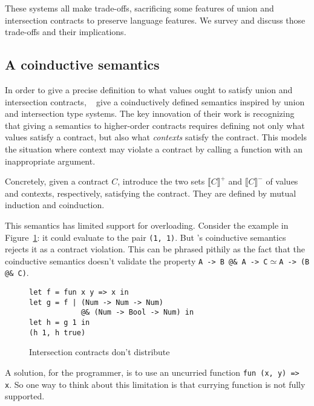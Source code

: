 \documentclass[sigplan,10pt]{acmart}
\newcommand{\nickel}[1]{\lstinline[language=nickel]{#1}}
\begin{document}
These systems all make trade-offs, sacrificing some features of union
and intersection contracts to preserve language features. We survey
and discuss those trade-offs and their implications.

\subsection{A coinductive semantics}
\label{sec:coinductive-sem}

In order to give a precise definition to what values ought to satisfy
union and intersection contracts,
\citeauthor{KeilThiemannUnionIntersection}~\cite{KeilThiemannUnionIntersection}
give a coinductively defined semantics inspired by union and
intersection type systems.
The key innovation of their work is recognizing that giving a
semantics to higher-order contracts requires defining not only what
values satisfy a contract, but also what \emph{contexts} satisfy the
contract. This models the situation where context may violate a
contract by calling a function with an inappropriate argument.

Concretely, given a contract $C$, \citeauthor{KeilThiemannUnionIntersection}
introduce the two sets $\llbracket C \rrbracket^+$ and $\llbracket C
\rrbracket^-$ of values and contexts, respectively, satisfying the contract.
They are defined by mutual induction and coinduction.

This semantics has limited support for overloading. Consider the example in
Figure~\ref{fig:intersection-distribution}: it could evaluate to the pair
\nickel{(1, 1)}. But \citeauthor{KeilThiemannUnionIntersection}'s coinductive
semantics rejects it as a contract violation.  This can be phrased pithily as
the fact that the coinductive semantics doesn't validate the property
\nickel{A -> B @& A -> C}$\simeq$\nickel{A -> (B @& C)}.

\begin{figure}[h]
\begin{lstlisting}[language=nickel]
let f = fun x y => x in
let g = f | (Num -> Num -> Num)
            @& (Num -> Bool -> Num) in
let h = g 1 in
(h 1, h true)
\end{lstlisting}
\caption{Intersection contracts don't distribute}
\label{fig:intersection-distribution}
\end{figure}

A solution, for the programmer, is to use an uncurried function
\nickel{fun (x, y) => x}. So one way to think about this limitation is
that currying function is not fully supported.
\end{document}
